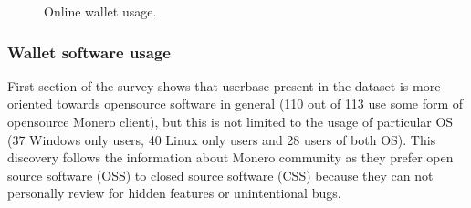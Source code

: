 \documentclass[
  printed, %
  table,   %
  lof,     %
  lot,     %
           oneside, color
]{fithesis3}
\begin{document}
\begin{center}
\begin{figure}[H]
\caption{Online wallet usage.}
\label{chart:price}\end{figure}\end{center}

\subsubsection{Wallet software usage}
First section of the survey shows that userbase present in the dataset is more oriented towards opensource software in general (110 out of 113 use some form of opensource Monero client), but this is not limited to the usage of particular OS (37 Windows only users, 40 Linux only users and 28 users of both OS). This discovery follows the information about Monero community as they prefer open source software (OSS) to closed source software (CSS) because they can not personally review for hidden features or unintentional bugs.
\end{document}
